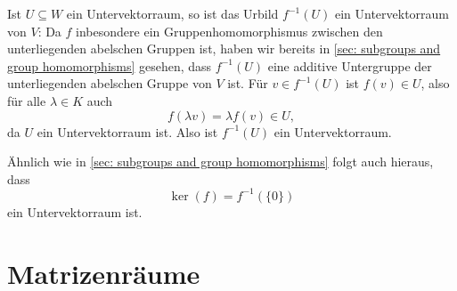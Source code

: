 Ist $U \subseteq W$ ein Untervektorraum, so ist das Urbild $f^{-1}(U)$ ein Untervektorraum von $V$: Da $f$ inbesondere ein Gruppenhomomorphismus zwischen den unterliegenden abelschen Gruppen ist, haben wir bereits in \ref{sec: subgroups and group homomorphisms} gesehen, dass $f^{-1}(U)$ eine additive Untergruppe der unterliegenden abelschen Gruppe von $V$ ist. Für $v \in f^{-1}(U)$ ist $f(v) \in U$, also für alle $\lambda \in K$ auch
\[
 f(\lambda v) = \lambda f(v) \in U,
\]
da $U$ ein Untervektorraum ist. Also ist $f^{-1}(U)$ ein Untervektorraum.


\begin{bem}
 Ähnlich wie in \ref{sec: subgroups and group homomorphisms} folgt auch hieraus, dass
 \[
  \ker(f) = f^{-1}(\{0\})
 \]
 ein Untervektorraum ist.
\end{bem}





\section{Matrizenräume}


